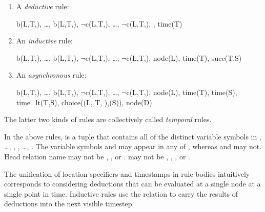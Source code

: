 \begin{enumerate}
\item 
A {\em deductive} rule:

\begin{Drules}
        {b(L,T,), \ldots, b(L,T,), $\lnot$c(L,T,), \ldots, $\lnot$c(L,T,), , time(T)}
\end{Drules}
\item 
An {\em inductive} rule:

\begin{Drules}
        {b(L,T,), \ldots, b(L,T,), $\lnot$c(L,T,), \ldots, $\lnot$c(L,T,), node(L), time(T), succ(T,S)}
\end{Drules}
\item 
An {\em asynchronous} rule:

\begin{Drules}
        {b(L,T,), \ldots, b(L,T,),
          $\lnot$c(L,T,), \ldots, $\lnot$c(L,T,),
          node(L), time(T), time(S), time_lt(T,S), choice((L, T, ),(S)), node(D)}
\end{Drules}
\end{enumerate}
The latter two kinds of rules are collectively called {\em temporal} rules.

In the above rules,  is a tuple that contains all of the distinct variable
symbols in , \ldots, , , \ldots,
.  The variable symbols  and  may appear in
any of , whereas  and  may not.
Head relation name  may not be , , or .
 may not be
, , , or \dedalus{<}.

The unification of location specifiers and timestamps in rule bodies intuitively corresponds to considering deductions that can be evaluated at a single node at a single point in time.  Inductive rules use the  relation to carry the results of deductions into the next visible timestep.

